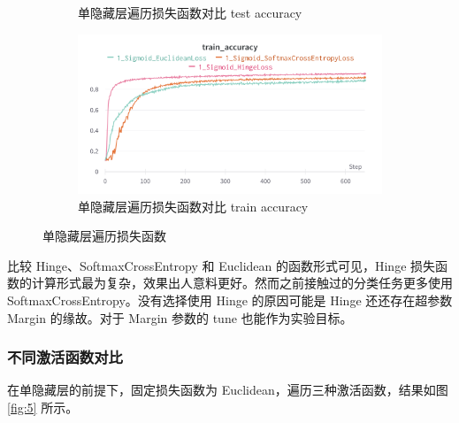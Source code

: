 \documentclass{article}
\begin{document}
\begin{figure}[htbp]
\begin{subfigure}{0.475\textwidth}
		\caption{单隐藏层遍历损失函数对比 test accuracy}
	\end{subfigure}
	\begin{subfigure}{0.475\textwidth}
		\centering
		\includegraphics[width=1\textwidth]{../pics/单层损失函数train_acc.png}
		\caption{单隐藏层遍历损失函数对比 train accuracy}
	\end{subfigure}
	\caption{单隐藏层遍历损失函数}
	\label{fig:4}
\end{figure}

比较 Hinge、SoftmaxCrossEntropy 和 Euclidean 的函数形式可见，Hinge 损失函数的计算形式最为复杂，效果出人意料更好。然而之前接触过的分类任务更多使用 SoftmaxCrossEntropy。没有选择使用 Hinge 的原因可能是 Hinge 还还存在超参数 Margin 的缘故。对于 Margin 参数的 tune 也能作为实验目标。


\subsubsection{不同激活函数对比}

在单隐藏层的前提下，固定损失函数为 Euclidean，遍历三种激活函数，结果如图 \ref{fig:5} 所示。
\end{document}
